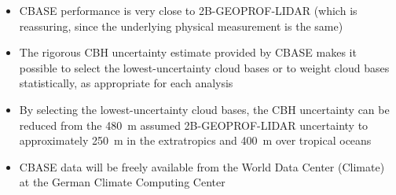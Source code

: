 \documentclass[final,t,12pt]{beamer}\usepackage[]{graphicx}\usepackage[]{color}
\begin{document}
\begin{frame}[fragile]{}
\begin{tcolorbox}
\begin{tcbitemize}[raster equal height=rows, raster columns = 11
      ]
\begin{tcbitemize}[raster columns=1]
        \tcbitem[add to natural height=\myspace, title={Conclusions}]
        \begin{itemize}
        \item CBASE performance is very close to 2B-GEOPROF-LIDAR (which is
          reassuring, since the underlying physical measurement is the same)
        \item The rigorous CBH uncertainty estimate provided by CBASE makes it
          possible to select the lowest-uncertainty cloud bases or to weight
          cloud bases statistically, as appropriate for each analysis
        \item By selecting the lowest-uncertainty cloud bases, the CBH
          uncertainty can be reduced from the 480~m assumed 2B-GEOPROF-LIDAR
          uncertainty to approximately 250~m in the extratropics and
          400~m over tropical oceans
        \item CBASE data will be freely available from the World Data Center
          (Climate) at the German Climate Computing Center
        \end{itemize}
      \end{tcbitemize}
    \end{tcbitemize}
  \end{tcolorbox}
\end{frame}
\end{document}
